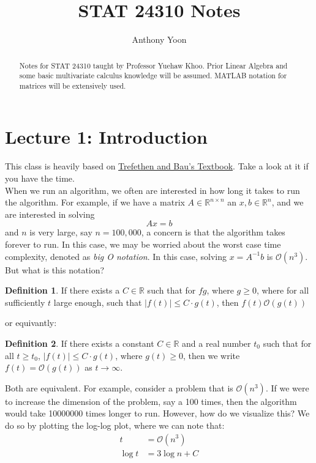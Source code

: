 \documentclass[11pt]{article}
\title{STAT 24310 Notes}
\author{Anthony Yoon}
\theoremstyle{definition}
\newtheorem{definition}{Definition}[section]
\newcommand{\R}{\mathbb{R}}
\begin{document}
\maketitle
\begin{abstract}
  Notes for STAT 24310 taught by Professor Yuehaw Khoo. Prior Linear Algebra and some basic multivariate calculus knowledge will be assumed.  MATLAB notation for matrices will be extensively used. 
\end{abstract}
\tableofcontents
\newpage
\section{Lecture 1: Introduction}
This class is heavily based on \href{https://www.stat.uchicago.edu/~lekheng/courses/309/books/Trefethen-Bau.pdf}{Trefethen and Bau's Textbook}. Take a look at it if you have the time. \\
When we run an algorithm, we often are interested in how long it takes to run the algorithm. For example, if we have a matrix $A \in \R^{n \times n}$ an $x, b \in \R^n$, and we are interested in solving 
\[
Ax = b
\]
and $n$ is very large, say $ n = 100,000$, a concern is that the algorithm takes forever to run. In this case, we may be worried about the worst case time complexity, denoted as \emph{big O notation}. In this case, solving $x = A^{-1} b$ is $\mathcal{O}(n^3)$. But what is this notation? 
\begin{definition}
  If there exists a $C \in \R$ such that for $f g$, where $g \geq 0$, where for all sufficiently $t$ large enough, such that $|f(t)| \leq C \cdot g(t)$, then $f(t) \mathcal{O}(g(t))$ 
\end{definition}
or equivantly:
\begin{definition}
  If there exists a constant \( C \in \mathbb{R} \) and a real number \( t_0 \) such that for all \( t \geq t_0 \), \( |f(t)| \leq C \cdot g(t) \), where \( g(t) \geq 0 \), then we write \( f(t) = \mathcal{O}(g(t)) \) as \( t \to \infty \).
\end{definition}
Both are equivalent. For example, consider a problem that is $\mathcal{O}(n^3)$. If we were to increase the dimension of the problem, say a 100 times, then the algorithm would take 10000000 times longer to run. However, how do we visualize this? We do so by plotting the log-log plot, where we can note that:
\begin{align*}
  t &= \mathcal{O}(n^3)\\
  \log t &= 3 \log n + C
\end{align*}
\end{document}
